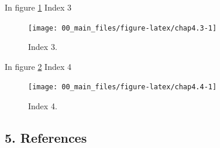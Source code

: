 \documentclass[
]{article}
\begin{document}
\newpage

In figure \ref{fig:chap4.3} Index 3

\begin{figure}

{\centering \texttt{[image: 00\_main\_files/figure-latex/chap4.3-1]} 

}

\caption{Index 3.}\label{fig:chap4.3}
\end{figure}

In figure \ref{fig:chap4.4} Index 4

\begin{figure}

{\centering \texttt{[image: 00\_main\_files/figure-latex/chap4.4-1]} 

}

\caption{Index 4.}\label{fig:chap4.4}
\end{figure}

\newpage

\hypertarget{references}{%
\subsection{5. References}\label{references}}
\end{document}
